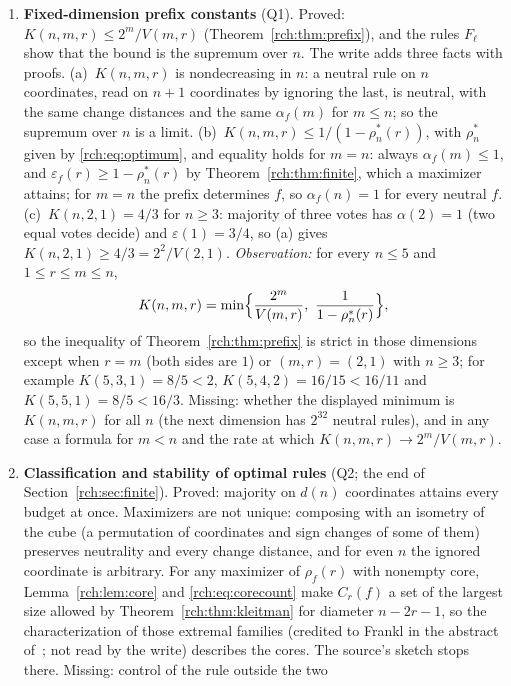 \documentclass[11pt]{article}
\theoremstyle{definition}
\theoremstyle{remark}
\newcommand{\eps}{\varepsilon}
\newcommand{\vol}{V}
\begin{document}
\begin{enumerate}[leftmargin=*,label=\textbf{\arabic*.},ref=\arabic*]
\item\label{rch:q:constants} \textbf{Fixed-dimension prefix constants}
 (Q1). Proved: $K(n,m,r)\le2^m/\vol(m,r)$
 (Theorem~\ref{rch:thm:prefix}), and the rules $F_\ell$ show that the bound
 is the supremum over $n$. The write adds three facts with proofs.
 (a)~$K(n,m,r)$ is nondecreasing in $n$: a neutral rule on $n$ coordinates,
 read on $n+1$ coordinates by ignoring the last, is neutral, with the same
 change distances and the same $\alpha_f(m)$ for $m\le n$; so the supremum
 over $n$ is a limit. (b)~$K(n,m,r)\le1/(1-\rho_n^*(r))$, with $\rho_n^*$
 given by \eqref{rch:eq:optimum}, and equality holds for $m=n$: always
 $\alpha_f(m)\le1$, and $\eps_f(r)\ge1-\rho_n^*(r)$ by
 Theorem~\ref{rch:thm:finite}, which a maximizer attains; for $m=n$ the
 prefix determines $f$, so $\alpha_f(n)=1$ for every neutral $f$.
 (c)~$K(n,2,1)=4/3$ for $n\ge3$: majority of three votes has
 $\alpha(2)=1$ (two equal votes decide) and $\eps(1)=3/4$, so (a) gives
 $K(n,2,1)\ge4/3=2^2/\vol(2,1)$. \emph{Observation:} for every $n\le5$ and
 $1\le r\le m\le n$,
 \[
  K(n,m,r)=\min\Bigl\{\frac{2^m}{\vol(m,r)},\ \frac1{1-\rho_n^*(r)}\Bigr\},
 \]
 so the inequality of Theorem~\ref{rch:thm:prefix} is strict in those
 dimensions except when $r=m$ (both sides are $1$) or $(m,r)=(2,1)$ with
 $n\ge3$; for
 example $K(5,3,1)=8/5<2$, $K(5,4,2)=16/15<16/11$ and $K(5,5,1)=8/5<16/3$.
 Missing: whether the displayed minimum is $K(n,m,r)$ for all $n$ (the next
 dimension has $2^{32}$ neutral rules), and in any case a formula for
 $m<n$ and the rate at which $K(n,m,r)\to2^m/\vol(m,r)$.
\item\label{rch:q:classify} \textbf{Classification and stability of optimal
 rules} (Q2; the end of Section~\ref{rch:sec:finite}). Proved: majority on
 $d(n)$ coordinates attains every budget at once. Maximizers are not unique:
 composing with an isometry of the cube (a permutation of coordinates and
 sign changes of some of them) preserves neutrality and every change
 distance, and for even $n$ the ignored coordinate is arbitrary. For any
 maximizer of $\rho_f(r)$ with nonempty core, Lemma~\ref{rch:lem:core} and
 \eqref{rch:eq:corecount} make $C_r(f)$ a set of the largest size allowed by
 Theorem~\ref{rch:thm:kleitman} for diameter $n-2r-1$, so the
 characterization of those extremal families (credited to Frankl in the
 abstract of~\cite{WuEtAl}; not read by the write) describes the cores. The
 source's sketch stops there. Missing: control of the rule outside the two

\end{enumerate}
\end{document}
